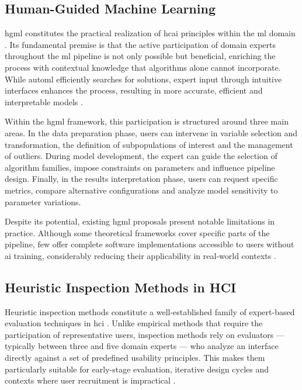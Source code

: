 \documentclass[a4paper,twoside]{article}
\begin{document}
\subsection{Human-Guided Machine Learning}

\Gls{hgml} constitutes the practical realization of \gls{hcai} principles within the \gls{ml} domain \cite{gil2019towards}. Its fundamental premise is that the active participation of domain experts throughout the \gls{ml} pipeline is not only possible but beneficial, enriching the process with contextual knowledge that algorithms alone cannot incorporate. While \gls{automl} efficiently searches for solutions, expert input through intuitive interfaces enhances the process, resulting in more accurate, efficient and interpretable models \cite{lindauer2024position}.

Within the \gls{hgml} framework, this participation is structured around three main areas. In the data preparation phase, users can intervene in variable selection and transformation, the definition of subpopulations of interest and the management of outliers. During model development, the expert can guide the selection of algorithm families, impose constraints on parameters and influence pipeline design. Finally, in the results interpretation phase, users can request specific metrics, compare alternative configurations and analyze model sensitivity to parameter variations.

Despite its potential, existing \gls{hgml} proposals present notable limitations in practice. Although some theoretical frameworks cover specific parts of the pipeline, few offer complete software implementations accessible to users without \gls{ai} training, considerably reducing their applicability in real-world contexts \cite{gil2019towards,francia2023hamlet,lee2020human,lindauer2024position}.

\subsection{Heuristic Inspection Methods in HCI}

Heuristic inspection methods constitute a well-established family of 
expert-based evaluation techniques in \gls{hci} \cite{nielsen1994usability}. 
Unlike empirical methods that require the participation of representative 
users, inspection methods rely on evaluators --- typically between three and 
five domain experts --- who analyze an interface directly against a set of 
predefined usability principles. This makes them particularly suitable for 
early-stage evaluation, iterative design cycles and contexts where user 
recruitment is impractical \cite{lazar2017research}.
\end{document}
